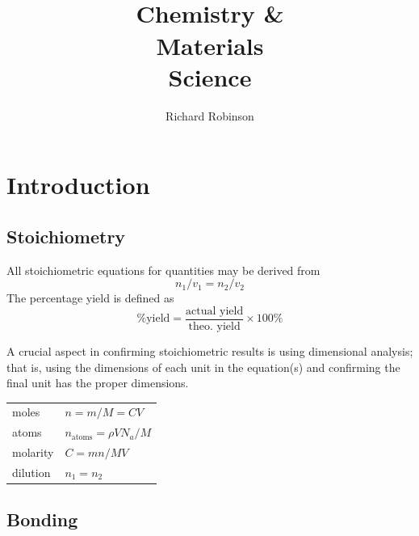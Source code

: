 \documentclass{tufte-book}
\title{\\ Chemistry \& \\ Materials \\ Science}
\author{Richard Robinson}
\begin{document}
\frontmatter
\maketitle

\setlength{\parindent}{0pt}

\mainmatter



\chapter{Introduction}

\section{Stoichiometry}

All stoichiometric equations for quantities may be derived from \begin{equation}
  n_1/v_1 = n_2/v_2
\end{equation}
The percentage yield is defined as \begin{equation}
  \text{\% yield} = \frac{\text{actual yield}}{\text{theo. yield}} \times 100 \%
\end{equation}

A crucial aspect in confirming stoichiometric results is using dimensional analysis; that is, using the dimensions of each unit in the equation(s) and confirming the final unit has the proper dimensions.
\begin{center}
  \begin{tabular}{ll}
    moles & $n = m/M = CV$ \\
    atoms & $n_{\mathrm{atoms}} = \rho V N_a / M$ \\
    molarity & $C = mn/MV$ \\
    dilution & $n_1 = n_2$
  \end{tabular}
\end{center}

\section{Bonding}
\end{document}
